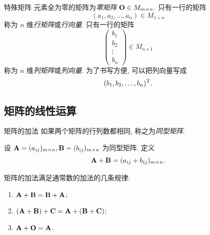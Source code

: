 \begin{frame}{特殊矩阵}
	\onslide<+->
	元素全为零的矩阵为\emph{零矩阵} ${\mathbf{O}}\in M_{m\times n}$.
	\onslide<+->
	只有一行的矩阵
	\[(a_1,a_2,\dots,a_n)\in M_{1\times n}\]
	称为 $n$ 维\emph{行矩阵}或\emph{行向量}.
	\onslide<+->
	只有一行的矩阵
	\[\begin{pmatrix}
		b_1\\b_2\\\vdots\\b_n
	\end{pmatrix}\in M_{n\times 1}\]
	称为 $n$ 维\emph{列矩阵}或\emph{列向量}.
	\onslide<+->
	为了书写方便, 可以把列向量写成
	\[(b_1,b_2,\dots,b_n)^{\mathrm{T}}.\]
\end{frame}


\subsection{矩阵的线性运算}
\begin{frame}{矩阵的加法}
	\onslide<+->
	如果两个矩阵的行列数都相同, 称之为\emph{同型矩阵}.
	\onslide<+->
	\begin{definition}
		设 ${\mathbf{A}}=(a_{ij})_{m\times n},{\mathbf{B}}=(b_{ij})_{m\times n}$ 为同型矩阵.
		定义
		\[{\mathbf{A}}+{\mathbf{B}}=(a_{ij}+b_{ij})_{m\times n}.\]
	\end{definition}
	\onslide<+->
	矩阵的加法满足通常数的加法的几条规律:
	\begin{enumerate}
		\item ${\mathbf{A}}+{\mathbf{B}}={\mathbf{B}}+{\mathbf{A}}$;
		\item $({\mathbf{A}}+{\mathbf{B}})+{\mathbf{C}}={\mathbf{A}}+({\mathbf{B}}+{\mathbf{C}})$;
		\item ${\mathbf{A}}+{\mathbf{O}}={\mathbf{A}}$.
	\end{enumerate}
\end{frame}



